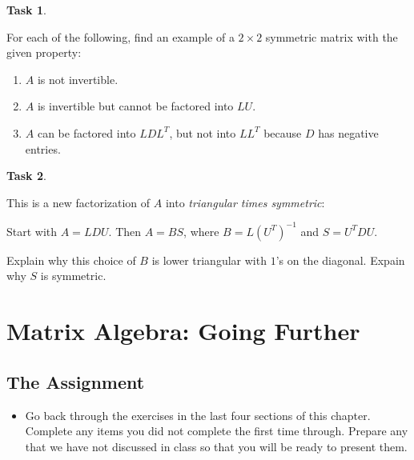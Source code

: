 \documentclass[10pt,]{book}
\theoremstyle{plain}
\theoremstyle{definition}
\numberwithin{equation}{section}
\newtheorem{task}{Task}[chapter]
\begin{document}
\begin{task}
\label{task-80}

        For each of the following, find an example of a \(2\times 2\)
        symmetric matrix with the given property:
        \begin{enumerate}
\item{} \(A\) is not invertible.\item{} \(A\) is invertible but cannot be factored into \(LU\).\item{}
            \(A\) can be factored into \(LDL^T\), but not into
            \(LL^T\) because \(D\) has negative entries.
          \end{enumerate}
\end{task}
\begin{task}
\label{task-81}

          This is a new factorization of \(A\) into \emph{triangular
          times symmetric}:
\par

          Start with \(A = LDU\). Then \(A = B S\),
          where \(B = L\left(U^T\right)^{-1}\) and \(S = U^T D U\).
\par

          Explain why this choice of \(B\) is lower triangular with
          \(1\)'s on the diagonal. Expain why \(S\) is symmetric.
\end{task}
\clearpage
\typeout{************************************************}
\typeout{************************************************}
\section[Matrix Algebra: Going Further]{Matrix Algebra: Going Further}\label{lin-eq-gf2}
\typeout{************************************************}
\typeout{************************************************}
\subsection[The Assignment]{The Assignment}\label{subsection-56}
\begin{itemize}
\item{}
      Go back through the exercises in the last four sections of this chapter.
      Complete any items you
      did not complete the first time through. Prepare any that we have not
      discussed in class so that you will be ready to present them.
    \end{itemize}
\typeout{************************************************}
\typeout{************************************************}
\end{document}
